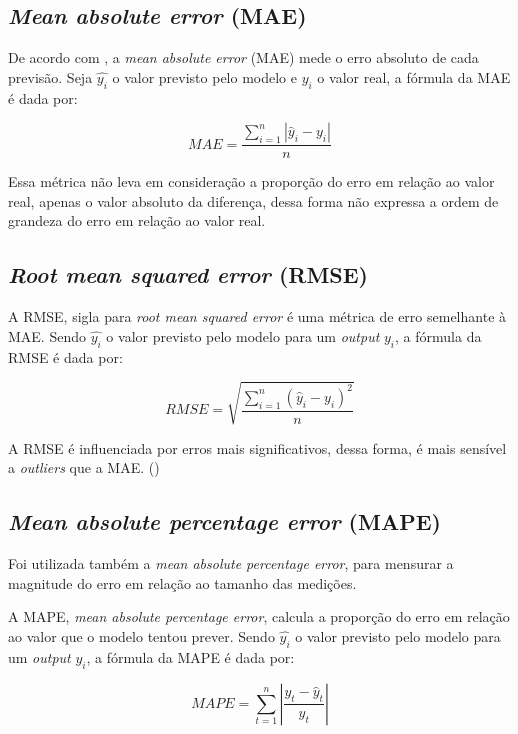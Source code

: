 \subsection{\textit{Mean absolute error} (MAE)}

De acordo com \citet{forecast-evaluation-ds}, a
\textit{mean absolute error} (MAE)
mede o erro absoluto de cada previsão. Seja $\hat{y_i}$ o valor previsto pelo 
modelo e $y_i$ o valor real, a fórmula da MAE é dada por:

\begin{equation}
    MAE = \frac{\sum_{i=1}^n |\hat{y}_i - y_i|}{n}
\end{equation}

Essa métrica não leva em consideração a proporção do erro em relação ao valor
real, apenas o valor absoluto da diferença, dessa forma não expressa a ordem de
grandeza do erro em relação ao valor real.

\subsection{\textit{Root mean squared error} (RMSE)}

A RMSE, sigla para \textit{root mean squared  error} é uma métrica de erro
semelhante à MAE. Sendo $\hat{y_i}$ o valor previsto pelo 
modelo para um \textit{output} $y_i$, a fórmula da RMSE é dada por: 

\begin{equation}
    RMSE = \sqrt{\frac{\sum_{i=1}^n (\hat{y}_i - y_i)^2}{n}}
\end{equation}

A RMSE é influenciada por erros mais significativos, dessa forma, é mais 
sensível a \textit{outliers} que a MAE. (\cite{forecast-evaluation-ds})

\subsection{\textit{Mean absolute percentage error} (MAPE)}

Foi utilizada também a \textit{mean absolute
percentage error}, para mensurar a magnitude do erro em 
relação ao tamanho das medições.

A MAPE, \textit{mean absolute percentage error}, calcula a proporção 
do erro em relação ao valor que o modelo tentou prever. Sendo $\hat{y_i}$ 
o valor previsto pelo 
modelo para um \textit{output} $y_i$, a fórmula da MAPE é dada por: 

\begin{equation}
    MAPE=\sum_{t=1}^n\left|\frac{y_t-\hat{y}_t}{y_t}\right|
\end{equation}

